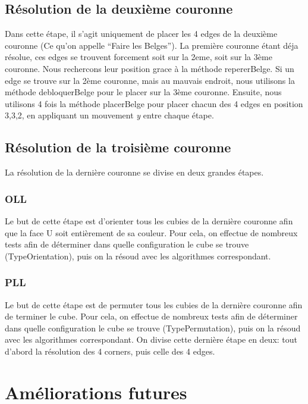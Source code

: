 \documentclass[a4paper,12pt]{article}
\begin{document}
\subsection{Résolution de la deuxième couronne}

Dans cette étape, il s'agit uniquement de placer les 4 edges de la deuxième couronne (Ce qu'on appelle ``Faire les Belges'').
La première couronne étant déja résolue, ces edges se trouvent forcement soit sur la 2eme, soit sur la 3ème couronne. Nous rechercons leur position grace à la méthode repererBelge.
Si un edge se trouve sur la 2ème couronne, mais au mauvais endroit, nous utilisons la méthode debloquerBelge pour le placer sur la 3ème couronne.
Ensuite, nous utilisons 4 fois la méthode placerBelge pour placer chacun des 4 edges en position 3,3,2, en appliquant un mouvement \textit{y} entre chaque étape.

\subsection{Résolution de la troisième couronne}

La résolution de la dernière couronne se divise en deux grandes étapes.

\subsubsection{OLL}
Le but de cette étape est d'orienter tous les cubies de la dernière couronne afin que la face U soit entièrement de sa couleur.
Pour cela, on effectue de nombreux tests afin de déterminer dans quelle configuration le cube se trouve (TypeOrientation), puis on la résoud avec les algorithmes correspondant.

\subsubsection{PLL}
Le but de cette étape est de permuter tous les cubies de la dernière couronne afin de terminer le cube.
Pour cela, on effectue de nombreux tests afin de déterminer dans quelle configuration le cube se trouve (TypePermutation), puis on la résoud avec les algorithmes correspondant.
On divise cette dernière étape en deux: tout d'abord la résolution des 4 corners, puis celle des 4 edges.

\section{Améliorations futures}
\end{document}
